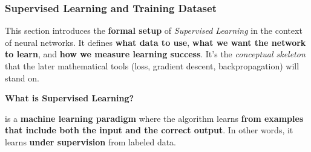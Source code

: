 \subsubsection{Supervised Learning and Training Dataset}\label{sec:supervised-learning-and-training-dataset}

This section introduces the \textbf{formal setup} of \emph{Supervised Learning} in the context of neural networks. It defines \textbf{what data to use}, \textbf{what we want the network to learn}, and \textbf{how we measure learning success}. It's the \emph{conceptual skeleton} that the later mathematical tools (loss, gradient descent, backpropagation) will stand on.

\highspace
\begin{flushleft}
    \textcolor{Green3}{ \textbf{What is Supervised Learning?}}
\end{flushleft}
 is a \textbf{machine learning paradigm} where the algorithm learns \textbf{from examples that include both the input and the correct output}. In other words, it learns \textbf{under supervision} from labeled data.

